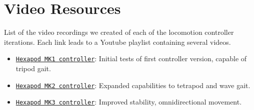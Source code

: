 \chapter*{Video Resources}

List of the video recordings we created of each of the locomotion controller iterations.
Each link leads to a Youtube playlist containing several videos.

\begin{itemize} 
	\item \href{https://www.youtube.com/playlist?list=PLS4sTWHhl8ch8N8BN3j6T0ZQ_9AVyyJ_g}{\texttt{Hexapod MK1 controller}}: Initial tests of first controller version, capable of tripod gait. \label{vid: MK1}
	
	\item \href{https://www.youtube.com/playlist?list=PLS4sTWHhl8cj9ypZECQ52zXKAU14XlxXN}{\texttt{Hexapod MK2 controller}}: Expanded capabilities to tetrapod and wave gait. \label{vid: MK2}
	
	\item \href{https://www.youtube.com/playlist?list=PLS4sTWHhl8ch6pUkxzVL7x9Dk8ctq-gox}{\texttt{Hexapod MK3 controller}}: Improved stability, omnidirectional movement. \label{vid: MK3}
\end{itemize}